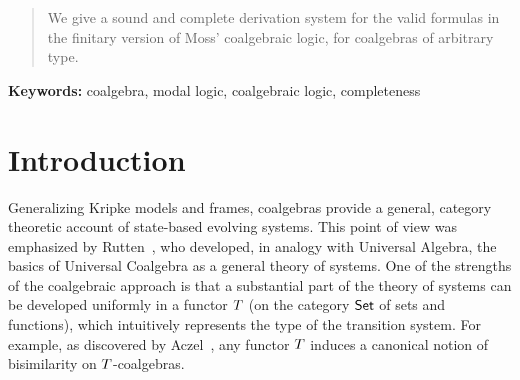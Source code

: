 \documentclass{book}
\begin{document}
\newcommand{\xxviproofspace}{\vspace{-8pt}} %
\newcommand{\xxvisingleton}{\eta}



\newcommand{\xxvilatjoin}{\xxvibv}
\newcommand{\xxvigen}{\mathcal{G}}
\newcommand{\xxviProp}{\mathrm{Prop}}
\newcommand{\xxviPres}{\mathsf{PRS}}
\newcommand{\xxvip}[1]{[#1]}

\newcommand{\xxviverberg}[1]{}


\begin{abstract}
  We give a sound and complete derivation system for the valid
  formulas in the finitary version of Moss' coalgebraic logic, for
  coalgebras of arbitrary type.
\end{abstract}

\textbf{Keywords:} coalgebra, modal logic, coalgebraic logic, 
   completeness


\EnableBpAbbreviations

%
\section{Introduction}

Generalizing Kripke models and frames, coalgebras provide a general,
category theoretic account of state-based evolving systems.  This
point of view was emphasized by Rutten~\cite{rutten:uc-j}, who
developed, in analogy with Universal Algebra, the basics of Universal
Coalgebra as a general theory of systems.  One of the strengths of the
coalgebraic approach is that a substantial part of the theory of
systems can be developed uniformly in a functor $T$ (on the
category $\mathsf{Set}$ of sets and functions), which intuitively
represents the type of the transition system.  For example, as
discovered by Aczel~\cite{aczel:nwfs}, any functor $T$ induces a
canonical notion of bisimilarity on $T$-coalgebras.
\end{document}
